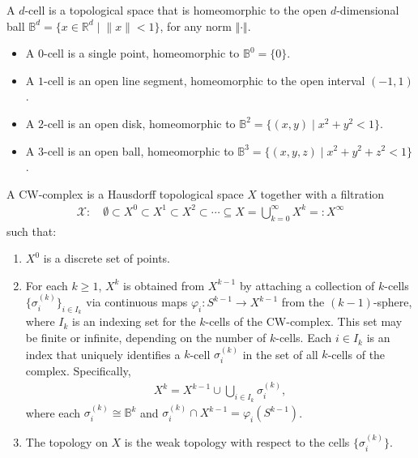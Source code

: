 \begin{definition}[\(d\)-cell]
A \(d\)-cell is a topological space that is homeomorphic to the open \(d\)-dimensional ball $\mathbb{B}^d = \{ x \in \mathbb{R}^d \; \vert \; \|x\| < 1 \}$, for any norm $\Vert \cdot \Vert$.
\end{definition}

\begin{example}\noindent
\begin{itemize}
    \item A $0$-cell is a single point, homeomorphic to \(\mathbb{B}^0 = \{ 0 \}\).
    \item A $1$-cell is an open line segment, homeomorphic to the open interval \((-1, 1)\).
    \item A $2$-cell is an open disk, homeomorphic to \(\mathbb{B}^2 = \{ (x, y) \; \vert \; x^2 + y^2 < 1 \}\).
    \item A $3$-cell is an open ball, homeomorphic to \(\mathbb{B}^3 = \{ (x, y, z) \; \vert \; x^2 + y^2 + z^2 < 1 \}\).
\end{itemize}
\end{example}

\begin{definition}
A CW-complex is a Hausdorff topological space \(X\) together with a filtration
\begin{align}
\mathcal{X}: \quad \emptyset \subset X^0 \subset X^1 \subset X^2 \subset \cdots \subseteq X = \bigcup_{k=0}^{\infty} X^k =: X^\infty
\end{align}
such that:
\begin{enumerate}
    \item \(X^0\) is a discrete set of points.
    \item For each \(k \geq 1\), \(X^k\) is obtained from \(X^{k-1}\) by attaching a collection of \(k\)-cells \(\{\sigma^{(k)}_i\}_{i \in I_k}\) via continuous maps \(\varphi_i : S^{k-1} \to X^{k-1}\) from the $(k-1)$-sphere, where \(I_k\) is an indexing set for the \(k\)-cells of the CW-complex. This set may be finite or infinite, depending on the number of \(k\)-cells. Each \(i \in I_k\) is an index that uniquely identifies a \(k\)-cell \(\sigma^{(k)}_i\) in the set of all \(k\)-cells of the complex. Specifically,
\begin{align}
    X^k = X^{k-1} \cup \bigcup_{i \in I_k} \sigma^{(k)}_i,
\end{align}
    where each \(\sigma^{(k)}_i \cong \mathbb{B}^k\) and \(\sigma^{(k)}_i \cap X^{k-1} = \varphi_i(S^{k-1})\).
    \item The topology on \(X\) is the weak topology with respect to the cells \(\{\sigma^{(k)}_i\}\).
\end{enumerate}
\end{definition}

